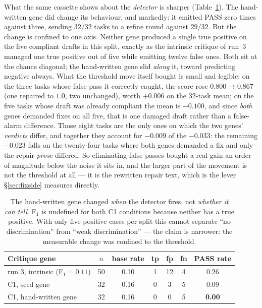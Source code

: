 \documentclass[11pt]{article}
\begin{document}
What the same cassette shows about the \emph{detector} is sharper (Table~\ref{tab:c1}). The
hand-written gene did change its behaviour, and markedly: it emitted PASS zero times
against three, sending $32/32$ tasks to a refine round against $29/32$. But the change is
confined to one axis. Neither gene produced a single true positive on the five compliant
drafts in this split, exactly as the intrinsic critique of run~3 managed one true positive
out of five while emitting twelve false ones. Both sit at the chance diagonal; the
hand-written gene slid \emph{along} it, toward predicting negative always. What the
threshold move itself bought is small and legible: on the three tasks whose false pass it
correctly caught, the score rose $0.800 \to 0.867$ (one repaired to $1.0$, two unchanged),
worth $+0.006$ on the 32-task mean; on the five tasks whose draft was already compliant the
mean is $-0.100$, and since \emph{both} genes demanded fixes on all five, that is one damaged
draft rather than a false-alarm difference. Those eight tasks are the only ones on which the
two genes' \emph{verdicts} differ, and together they account for $-0.009$ of the $-0.033$: the
remaining $-0.023$ falls on the twenty-four tasks where both genes demanded a fix and only the
repair \emph{prose} differed. So eliminating false passes bought a real gain an order of
magnitude below the noise it sits in, and the larger part of the movement is not the threshold
at all --- it is the rewritten repair text, which is the lever \S\ref{sec:fixside} measures
directly.

\begin{table}[h]
\centering
\small
\begin{tabular}{lcccccc}
\toprule
Critique gene & $n$ & base rate & tp & fp & fn & PASS rate \\
\midrule
run 3, intrinsic (F$_1 = 0.11$) & 50 & 0.10 & 1 & 12 & 4 & 0.26 \\
C1, seed gene & 32 & 0.16 & 0 & 3 & 5 & 0.09 \\
C1, hand-written gene & 32 & 0.16 & 0 & 0 & 5 & \textbf{0.00} \\
\bottomrule
\end{tabular}
\caption{The hand-written gene changed \emph{when} the detector fires, not \emph{whether it
can tell}. F$_1$ is undefined for both C1 conditions because neither has a true positive.
With only five positive cases per split this cannot separate ``no discrimination'' from
``weak discrimination'' --- the claim is narrower: the measurable change was confined to the
threshold.}
\label{tab:c1}
\end{table}
\end{document}
